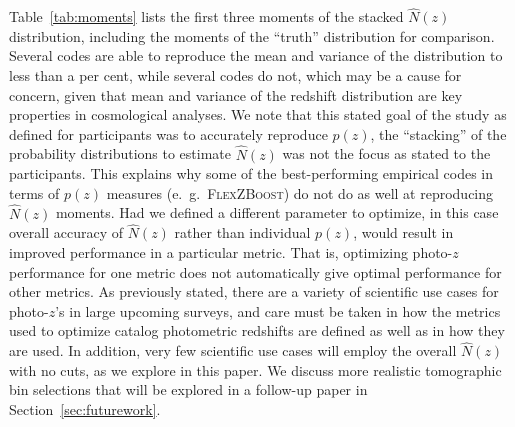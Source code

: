 \documentclass[usenatbib]{mn2e}
\newcommand{\red}[1]{\textcolor{red}{#1}}
\begin{document}
Table~\ref{tab:moments} lists the first three moments of the stacked $\hat{N}(z)$ distribution, including the moments of the ``truth'' distribution for comparison.  Several codes are able to reproduce the mean and variance of the distribution to less than a per cent, while several codes do not, which may be a cause for concern, given that mean and variance of the redshift distribution are key properties in cosmological analyses.  We note that this stated goal of the study as defined for participants was to accurately reproduce $p(z)$, the ``stacking'' of the probability distributions to estimate $\hat{N}(z)$ was not the focus as stated to the participants.  This explains why some of the best-performing empirical codes in terms of $p(z)$ measures (e.~g.~\textsc{FlexZBoost}) do not do as well at reproducing $\hat{N}(z)$ moments.  Had we defined a different parameter to optimize, in this case overall accuracy of $\hat{N}(z)$ rather than individual $p(z)$, would result in improved performance in a particular metric.  That is, optimizing photo-$z$ performance for one metric does not automatically give optimal performance for other metrics.  As previously stated, there are a variety of scientific use cases for photo-$z$'s in large upcoming surveys, and care must be taken in how the metrics used to optimize catalog photometric redshifts are defined as well as in how they are used.  In addition, very few scientific use cases will employ the overall $\hat{N}(z)$ with no cuts, as we explore in this paper.  We discuss more realistic tomographic bin selections that will be explored in a follow-up paper in Section~\ref{sec:futurework}.




\end{document}
